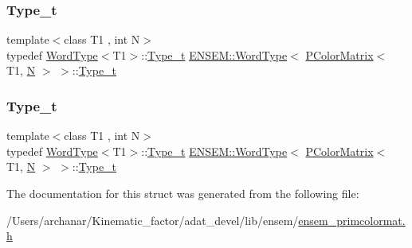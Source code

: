 \subsubsection{\texorpdfstring{Type\_t}{Type\_t}\hspace{0.1cm}{\footnotesize\ttfamily [1/2]}}
{\footnotesize\ttfamily template$<$class T1 , int N$>$ \\
typedef \mbox{\hyperlink{structENSEM_1_1WordType}{Word\+Type}}$<$T1$>$\+::\mbox{\hyperlink{structENSEM_1_1WordType_3_01PColorMatrix_3_01T1_00_01N_01_4_01_4_a32aa3b6b38804a81d375ed7a84abe6c7}{Type\+\_\+t}} \mbox{\hyperlink{structENSEM_1_1WordType}{E\+N\+S\+E\+M\+::\+Word\+Type}}$<$ \mbox{\hyperlink{classENSEM_1_1PColorMatrix}{P\+Color\+Matrix}}$<$ T1, \mbox{\hyperlink{operator__name__util_8cc_a7722c8ecbb62d99aee7ce68b1752f337}{N}} $>$ $>$\+::\mbox{\hyperlink{structENSEM_1_1WordType_3_01PColorMatrix_3_01T1_00_01N_01_4_01_4_a32aa3b6b38804a81d375ed7a84abe6c7}{Type\+\_\+t}}}

\mbox{\label{structENSEM_1_1WordType_3_01PColorMatrix_3_01T1_00_01N_01_4_01_4_a32aa3b6b38804a81d375ed7a84abe6c7}} 
\subsubsection{\texorpdfstring{Type\_t}{Type\_t}\hspace{0.1cm}{\footnotesize\ttfamily [2/2]}}
{\footnotesize\ttfamily template$<$class T1 , int N$>$ \\
typedef \mbox{\hyperlink{structENSEM_1_1WordType}{Word\+Type}}$<$T1$>$\+::\mbox{\hyperlink{structENSEM_1_1WordType_3_01PColorMatrix_3_01T1_00_01N_01_4_01_4_a32aa3b6b38804a81d375ed7a84abe6c7}{Type\+\_\+t}} \mbox{\hyperlink{structENSEM_1_1WordType}{E\+N\+S\+E\+M\+::\+Word\+Type}}$<$ \mbox{\hyperlink{classENSEM_1_1PColorMatrix}{P\+Color\+Matrix}}$<$ T1, \mbox{\hyperlink{operator__name__util_8cc_a7722c8ecbb62d99aee7ce68b1752f337}{N}} $>$ $>$\+::\mbox{\hyperlink{structENSEM_1_1WordType_3_01PColorMatrix_3_01T1_00_01N_01_4_01_4_a32aa3b6b38804a81d375ed7a84abe6c7}{Type\+\_\+t}}}



The documentation for this struct was generated from the following file\+:\begin{DoxyCompactItemize}
\item 
/\+Users/archanar/\+Kinematic\+\_\+factor/adat\+\_\+devel/lib/ensem/\mbox{\hyperlink{lib_2ensem_2ensem__primcolormat_8h}{ensem\+\_\+primcolormat.\+h}}\end{DoxyCompactItemize}
